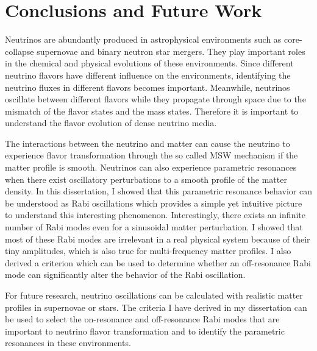 \chapter{\label{chap:conclusion}Conclusions and Future Work}

Neutrinos are abundantly produced in astrophysical environments such as core-collapse supernovae and binary neutron star mergers. They play important roles in the chemical and physical evolutions of these environments. Since different neutrino flavors have different influence on the environments, identifying the neutrino fluxes in different flavors becomes important. Meanwhile, neutrinos oscillate between different flavors while they propagate through space due to the mismatch of the flavor states and the mass states. Therefore it is important to understand the flavor evolution of dense neutrino media.

The interactions between the neutrino and matter can cause the neutrino to experience flavor transformation through the so called MSW mechanism if the matter profile is smooth. Neutrinos can also experience parametric resonances when there exist oscillatory perturbations to a smooth profile of the matter density. In this dissertation, I showed that this parametric resonance behavior can be understood as Rabi oscillations which provides a simple yet intuitive picture to understand this interesting phenomenon. Interestingly, there exists an infinite number of Rabi modes even for a sinusoidal matter perturbation. I showed that most of these Rabi modes are irrelevant in a real physical system because of their tiny amplitudes, which is also true for multi-frequency matter profiles. I also derived a criterion which can be used to determine whether an off-resonance Rabi mode can significantly alter the behavior of the Rabi oscillation.

For future research, neutrino oscillations can be calculated with realistic matter profiles in supernovae or stars. The criteria I have derived in my dissertation can be used to select the on-resonance and off-resonance Rabi modes that are important to neutrino flavor transformation and to identify the parametric resonances in these environments.

